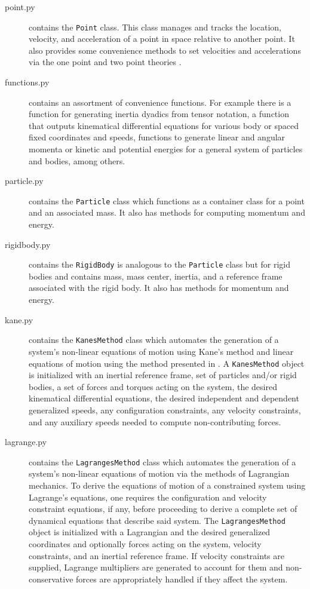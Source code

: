 \documentclass[twocolumn,10pt]{asme2e}
\begin{document}
\begin{description}
\begin{description}
    \end{description}
  \item[point.py] contains the \verb|Point| class. This class manages
    and tracks the location, velocity, and acceleration of a point in space
    relative to another point. It also provides some convenience methods to set
    velocities and accelerations via the one point and two point theories
    \cite{Kane1985}.
  \item[functions.py] contains an assortment of convenience functions. For
    example there is a function for generating inertia dyadics from tensor
    notation, a function that outputs kinematical differential equations for
    various body or spaced fixed coordinates and speeds, functions to generate
    linear and angular momenta or kinetic and potential energies for a general
    system of particles and bodies, among others.
  \item[particle.py] contains the \verb|Particle| class which functions as a
    container class for a point and an associated mass. It also has methods for
    computing momentum and energy.
  \item[rigidbody.py] contains the \verb|RigidBody| is analogous to the
    \verb|Particle| class but for rigid bodies and contains mass, mass center,
    inertia, and a reference frame associated with the rigid body. It also has
    methods for momentum and energy.
  \item[kane.py] contains the \verb|KanesMethod| class which automates the
    generation of a system's non-linear equations of motion using Kane's
    method\cite{Kane1985} and linear equations of motion using the method
    presented in \cite{Peterson2013}. A \verb|KanesMethod| object is initialized
    with an inertial reference frame, set of particles and/or rigid bodies, a
    set of forces and torques acting on the system, the desired kinematical
    differential equations, the desired independent and dependent generalized
    speeds, any configuration constraints, any velocity constraints, and any
    auxiliary speeds needed to compute non-contributing forces.
  \item[lagrange.py] contains the \verb|LagrangesMethod| class which automates
    the generation of a system's non-linear equations of motion via the methods
    of Lagrangian mechanics\cite{Crandall1968}. To derive the equations of
    motion of a constrained system using Lagrange's equations, one requires the
    configuration and velocity constraint equations, if any, before proceeding
    to derive a complete set of dynamical equations that describe said system.
    The \verb|LagrangesMethod| object is initialized with a Lagrangian and the
    desired generalized coordinates and optionally forces acting on the system,
    velocity constraints, and an inertial reference frame. If velocity
    constraints are supplied, Lagrange multipliers are generated to account for
    them and non-conservative forces are appropriately handled if they affect
    the system.
\end{description}
\end{document}
